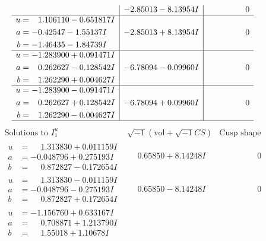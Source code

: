 \documentclass[1p]{elsarticle_modified}
\theoremstyle{definition}
\newcommand{\I}{\sqrt{-1}}
\begin{document}
$$\begin{array}{c|c|c}
 & -2.85013 - 8.13954 I & \phantom{-0.000000 } 0 \\ \hline\begin{aligned}
u &= \phantom{-}1.106110 - 0.651817 I \\
a &= -0.42547 - 1.55137 I \\
b &= -1.46435 - 1.84739 I\end{aligned}
 & -2.85013 + 8.13954 I & \phantom{-0.000000 } 0 \\ \hline\begin{aligned}
u &= -1.283900 + 0.091471 I \\
a &= \phantom{-}0.262627 - 0.128542 I \\
b &= \phantom{-}1.262290 + 0.004627 I\end{aligned}
 & -6.78094 - 0.09960 I & \phantom{-0.000000 } 0 \\ \hline\begin{aligned}
u &= -1.283900 - 0.091471 I \\
a &= \phantom{-}0.262627 + 0.128542 I \\
b &= \phantom{-}1.262290 - 0.004627 I\end{aligned}
 & -6.78094 + 0.09960 I & \phantom{-0.000000 } 0\\
 \hline 
 \end{array}$$\newpage$$\begin{array}{c|c|c}  
\text{Solutions to }I^u_{1}& \I (\text{vol} + \sqrt{-1}CS) & \text{Cusp shape}\\
 \hline 
\begin{aligned}
u &= \phantom{-}1.313830 + 0.011159 I \\
a &= -0.048796 + 0.275193 I \\
b &= \phantom{-}0.872827 - 0.172654 I\end{aligned}
 & \phantom{-}0.65850 + 8.14248 I & \phantom{-0.000000 } 0 \\ \hline\begin{aligned}
u &= \phantom{-}1.313830 - 0.011159 I \\
a &= -0.048796 - 0.275193 I \\
b &= \phantom{-}0.872827 + 0.172654 I\end{aligned}
 & \phantom{-}0.65850 - 8.14248 I & \phantom{-0.000000 } 0 \\ \hline\begin{aligned}
u &= -1.156760 + 0.633167 I \\
a &= \phantom{-}0.708871 + 1.213790 I \\
b &= \phantom{-}1.55018 + 1.10678 I\end{aligned}

\end{array}$$
\end{document}
